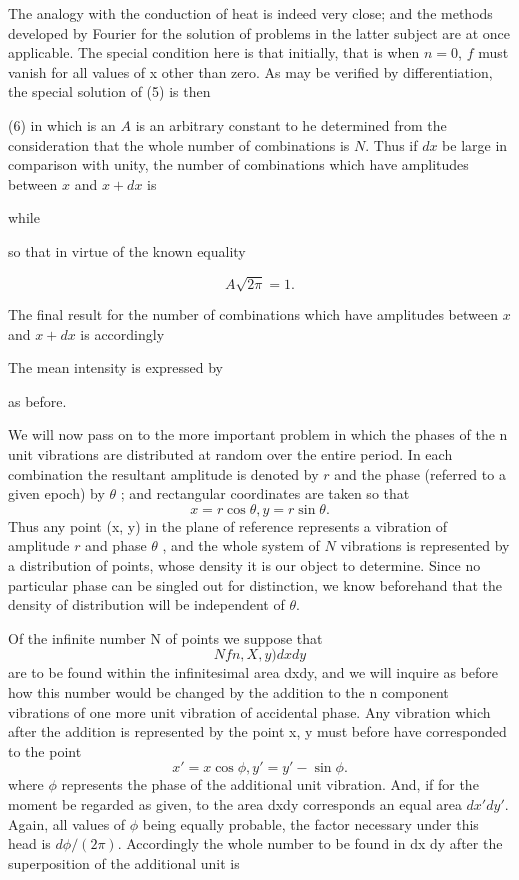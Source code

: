 The analogy with the conduction of heat is indeed very close; and the methods
developed by Fourier for the solution of problems in the latter subject are at
once applicable. The special condition here is that initially, that is when \(n
= 0\), \(f\) must vanish for all values of x other than zero. As may be
verified by differentiation, the special solution of (5) is then

(6)
in which is an \(A\) is an arbitrary constant to he determined from the
consideration that the whole number of combinations is \(N\).  Thus if \(dx\)
be large in comparison with unity, the number of combinations which have
amplitudes between \(x\) and \(x + dx\) is

while

so that in virtue of the known equality

\[ A \sqrt{2 \pi} = 1.\]

The final result for the number of combinations which have amplitudes between
\(x\) and \(x + dx\) is accordingly

The mean intensity is expressed by

as before.

We will now pass on to the more important problem in which the phases of
the n unit vibrations are distributed at random over the entire period.
In each combination the resultant amplitude is denoted by \(r\) and the
phase (referred to a given epoch) by
\(\theta \)
; and rectangular coordinates are taken so that
\[ x =r \cos \theta, y =r \sin \theta.\]
Thus any point (x, y) in the plane of reference represents a vibration
of amplitude \(r\) and phase
\(\theta \)
, and the whole system of
\(N\)
vibrations is
represented by a distribution of points, whose density it is our object
to determine. Since no particular phase can be singled out for
distinction, we know beforehand that the density of distribution will be
independent of \(\theta \).

Of the infinite number N of points we suppose that
\[
Nf n, X, y) dxdy
\]
are to be found within the infinitesimal area dxdy, and we will inquire as
before how this number would be changed by the addition to the n
component vibrations of one more unit vibration of accidental phase. Any
vibration which after the addition is represented by the point x, y must
before have corresponded to the point
\[ x' = x \cos \phi, y' = y' - \sin \phi.\]
where
\(\phi \)
represents the phase of the additional unit vibration. And, if for the
moment be regarded as given, to the area dxdy corresponds an equal area
\( dx' dy' \). Again, all values of
\(\phi \)
being equally probable, the factor necessary
under this head is
\(d \phi/(2 \pi) \).
Accordingly the whole number to be found in dx dy
after the superposition of the additional unit is

